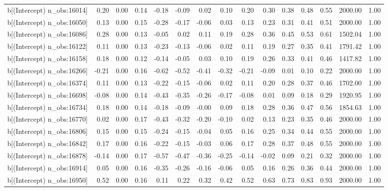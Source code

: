 \begin{table}[ht]
\begin{tabular}{rrrrrrrrrrrrrrr}
  b[(Intercept) n\_obs:16014] & 0.20 & 0.00 & 0.14 & -0.18 & -0.09 & 0.02 & 0.10 & 0.20 & 0.30 & 0.38 & 0.48 & 0.55 & 2000.00 & 1.00 \\ 
  b[(Intercept) n\_obs:16050] & 0.13 & 0.00 & 0.15 & -0.28 & -0.17 & -0.06 & 0.03 & 0.13 & 0.23 & 0.31 & 0.41 & 0.51 & 2000.00 & 1.00 \\ 
  b[(Intercept) n\_obs:16086] & 0.28 & 0.00 & 0.13 & -0.05 & 0.02 & 0.11 & 0.19 & 0.28 & 0.36 & 0.45 & 0.53 & 0.61 & 1502.04 & 1.00 \\ 
  b[(Intercept) n\_obs:16122] & 0.11 & 0.00 & 0.13 & -0.23 & -0.13 & -0.06 & 0.02 & 0.11 & 0.19 & 0.27 & 0.35 & 0.41 & 1791.42 & 1.00 \\ 
  b[(Intercept) n\_obs:16158] & 0.18 & 0.00 & 0.12 & -0.14 & -0.05 & 0.03 & 0.10 & 0.19 & 0.26 & 0.33 & 0.41 & 0.46 & 1417.82 & 1.00 \\ 
  b[(Intercept) n\_obs:16266] & -0.21 & 0.00 & 0.16 & -0.62 & -0.52 & -0.41 & -0.32 & -0.21 & -0.09 & 0.01 & 0.10 & 0.22 & 2000.00 & 1.00 \\ 
  b[(Intercept) n\_obs:16374] & 0.11 & 0.00 & 0.13 & -0.22 & -0.15 & -0.06 & 0.02 & 0.11 & 0.20 & 0.28 & 0.37 & 0.46 & 1702.00 & 1.00 \\ 
  b[(Intercept) n\_obs:16698] & -0.08 & 0.00 & 0.14 & -0.43 & -0.35 & -0.26 & -0.17 & -0.08 & 0.01 & 0.09 & 0.18 & 0.29 & 1920.95 & 1.00 \\ 
  b[(Intercept) n\_obs:16734] & 0.18 & 0.00 & 0.14 & -0.18 & -0.09 & -0.00 & 0.09 & 0.18 & 0.28 & 0.36 & 0.47 & 0.56 & 1854.63 & 1.00 \\ 
  b[(Intercept) n\_obs:16770] & 0.02 & 0.00 & 0.17 & -0.43 & -0.32 & -0.20 & -0.10 & 0.02 & 0.13 & 0.23 & 0.35 & 0.46 & 2000.00 & 1.00 \\ 
  b[(Intercept) n\_obs:16806] & 0.15 & 0.00 & 0.15 & -0.24 & -0.15 & -0.04 & 0.05 & 0.16 & 0.25 & 0.34 & 0.44 & 0.55 & 2000.00 & 1.00 \\ 
  b[(Intercept) n\_obs:16842] & 0.17 & 0.00 & 0.16 & -0.22 & -0.15 & -0.03 & 0.06 & 0.17 & 0.28 & 0.37 & 0.48 & 0.55 & 2000.00 & 1.00 \\ 
  b[(Intercept) n\_obs:16878] & -0.14 & 0.00 & 0.17 & -0.57 & -0.47 & -0.36 & -0.25 & -0.14 & -0.02 & 0.09 & 0.21 & 0.32 & 2000.00 & 1.00 \\ 
  b[(Intercept) n\_obs:16914] & 0.05 & 0.00 & 0.16 & -0.35 & -0.26 & -0.16 & -0.06 & 0.05 & 0.16 & 0.26 & 0.36 & 0.44 & 2000.00 & 1.00 \\ 
  b[(Intercept) n\_obs:16950] & 0.52 & 0.00 & 0.16 & 0.11 & 0.22 & 0.32 & 0.42 & 0.52 & 0.63 & 0.73 & 0.83 & 0.93 & 2000.00 & 1.00 \\ 

\end{tabular}
\end{table}
